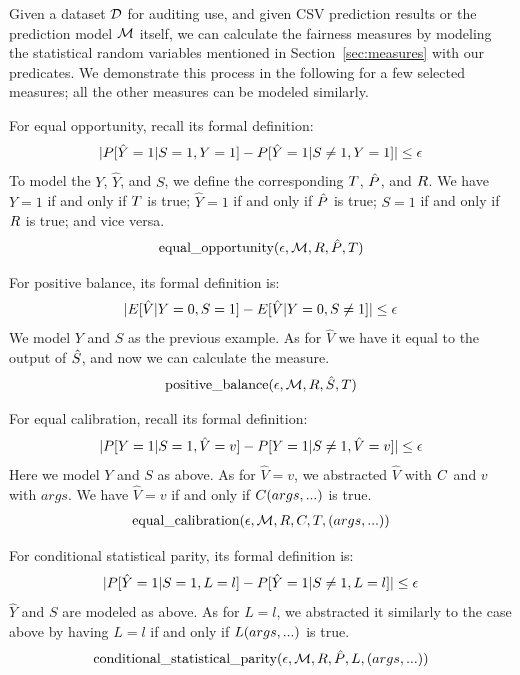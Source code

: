 \documentclass[conference]{IEEEtran}
\begin{document}
Given a dataset $\mathcal{D}$ for auditing use, and given CSV prediction results or the prediction model $\mathcal{M}$ itself, we can calculate the fairness measures by modeling the statistical random variables mentioned in Section~\ref{sec:measures} with our predicates. We demonstrate this process in the following for a few selected measures; all the other measures can be modeled similarly.

For equal opportunity, recall its formal definition:
\begin{align*}
    \lvert P[\hat{Y} = 1 | S = 1, Y = 1] - P[\hat{Y} = 1 | S \neq 1, Y = 1]\rvert \leq \epsilon
\end{align*}
To model the $Y$, $\hat{Y}$, and $S$, we define the corresponding $T$, $\hat{P}$, and $R$. We have $Y = 1$ if and only if $T$ is true; $\hat{Y} = 1$ if and only if $\hat{P}$ is true; $S = 1$ if and only if $R$ is true; and vice versa.
\begin{align*}
    \text{equal\_opportunity} (\epsilon, \mathcal{M}, R, \hat{P}, T)
\end{align*}

For positive balance, its formal definition is:
\begin{align*}
    \lvert E[\hat{V} | Y = 0, S = 1] - E[\hat{V} | Y = 0, S \neq 1]\rvert \leq \epsilon
\end{align*}
We model $Y$ and $S$ as the previous example. As for $\hat{V}$ we have it equal to the output of $\hat{S}$, and now we can calculate the measure.
\begin{align*}
    \text{positive\_balance} (\epsilon, \mathcal{M}, R, \hat{S}, T)
\end{align*}

For equal calibration, recall its formal definition:
\begin{align*}
    \lvert P[Y = 1 | S = 1, \hat{V} = v] - P[Y = 1 | S \neq 1, \hat{V} = v]\rvert \leq \epsilon
\end{align*}
Here we model $Y$ and $S$ as above. As for $\hat{V} = v$, we abstracted $\hat{V}$ with $C$ and $v$ with $args$. We have $\hat{V} = v$ if and only if $C(args, ...)$ is true.
\begin{align*}
    \text{equal\_calibration} (\epsilon, \mathcal{M}, R, C, T, (args, ...))
\end{align*}

For conditional statistical parity, its formal definition is:
\[
    \lvert P[\hat{Y} = 1 | S = 1, L = l] - P[\hat{Y} = 1 | S \neq 1, L = l]\rvert \leq \epsilon
\]
$\hat{Y}$ and $S$ are modeled as above. As for $L = l$, we abstracted it similarly to the case above by having $L = l$ if and only if $L(args, ...)$ is true.
\begin{align*}
    \text{conditional\_statistical\_parity} (\epsilon, \mathcal{M}, R, \hat{P}, L, (args, ...))
\end{align*}
\end{document}
